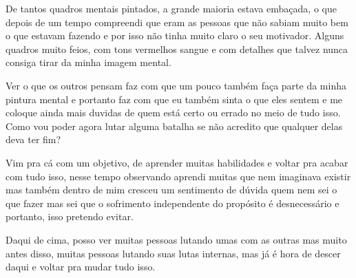 De tantos quadros mentais pintados, a grande maioria estava embaçada, o que depois de um tempo compreendi que eram as pessoas que não sabiam muito bem o que estavam fazendo e por isso não tinha muito claro o seu motivador. Alguns quadros muito feios, com tons vermelhos sangue e com detalhes que talvez nunca consiga tirar da minha imagem mental.

Ver o que os outros pensam faz com que um pouco também faça parte da minha pintura mental e portanto faz com que eu também sinta o que eles sentem e me coloque ainda mais duvidas de quem está certo ou errado no meio de tudo isso. Como vou poder agora lutar alguma batalha se não acredito que qualquer delas deva ter fim?

Vim pra cá com um objetivo, de aprender muitas habilidades e voltar pra acabar com tudo isso, nesse tempo observando aprendi muitas que nem imaginava existir mas também dentro de mim cresceu um sentimento de dúvida quem nem sei o que fazer mas sei que o sofrimento independente do propósito é desnecessário e portanto, isso pretendo evitar.

Daqui de cima, posso ver muitas pessoas lutando umas com as outras mas muito antes disso, muitas pessoas lutando suas lutas internas, mas já é hora de descer daqui e voltar pra mudar tudo isso.
